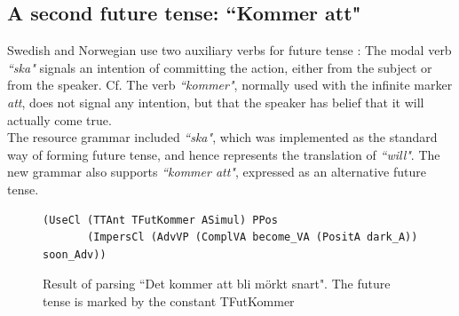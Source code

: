 \documentclass{report}
\begin{document}

\subsection{A second future tense: ``Kommer att"}
Swedish and Norwegian use two auxiliary verbs for future tense
\cite[p. 246]{H&H}:
The modal verb \emph{``ska"} signals an intention of committing the action, either from the subject or from
the speaker. Cf.
The verb \emph{``kommer"}, normally used with the infinite marker \emph{att},
does not signal any intention, but that the speaker has belief that 
it will actually come true.\\
The resource grammar included 
\emph{``ska"}, which was implemented as the standard way of forming future
tense, and hence represents the translation of
\emph{``will"}. 
The new grammar also supports \emph{``kommer att"}, expressed as an alternative
future tense.
\begin{figure}[h]
\begin{verbatim}
(UseCl (TTAnt TFutKommer ASimul) PPos 
       (ImpersCl (AdvVP (ComplVA become_VA (PositA dark_A)) soon_Adv))
\end{verbatim}
\caption{Result of parsing ``Det kommer att bli mörkt snart". The future tense
         is marked by the constant TFutKommer}
  \label{fig:kommeratt}
\end{figure}
\end{document}
